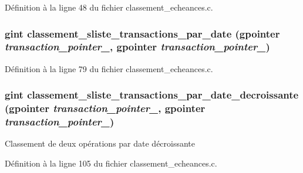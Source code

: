 Définition à la ligne 48 du fichier classement\_\-echeances.c.

\subsubsection[{classement\_\-sliste\_\-transactions\_\-par\_\-date}]{\setlength{\rightskip}{0pt plus 5cm}gint classement\_\-sliste\_\-transactions\_\-par\_\-date (gpointer {\em transaction\_\-pointer\_}, \/  gpointer {\em transaction\_\-pointer\_})}\label{classement__echeances_8c_a232a7c3b304a4f2fa38967d8e761d827}


Définition à la ligne 79 du fichier classement\_\-echeances.c.

\subsubsection[{classement\_\-sliste\_\-transactions\_\-par\_\-date\_\-decroissante}]{\setlength{\rightskip}{0pt plus 5cm}gint classement\_\-sliste\_\-transactions\_\-par\_\-date\_\-decroissante (gpointer {\em transaction\_\-pointer\_}, \/  gpointer {\em transaction\_\-pointer\_})}\label{classement__echeances_8c_a31706ce946b77cec0e449468cd49b194}
Classement de deux opérations par date décroissante 

Définition à la ligne 105 du fichier classement\_\-echeances.c.

